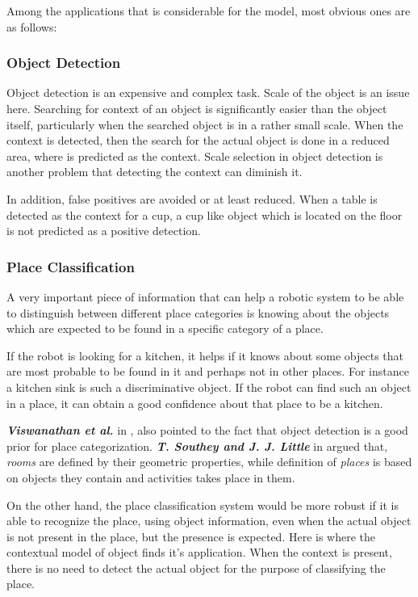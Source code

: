 Among the applications that is considerable for the model, most obvious ones are as follows:


\subsubsection*{Object Detection}

Object detection is an expensive and complex task. Scale of the object is an issue here. Searching for context of 
an object is significantly easier than the object itself, particularly when the searched object is in a rather small scale. 
When the context is detected, then the search for the actual object is done in a reduced area, where is predicted as the context. 
Scale selection in object detection is another problem that detecting the context can diminish it.  

In addition, false positives are avoided or at least reduced. When a table is detected as the context for a cup, a cup like object 
which is located on the floor is not predicted as a positive detection.    

\subsubsection*{Place Classification}
 
      A very important piece of information that can help a robotic system to be able to distinguish between different place categories 
is knowing about the objects which are expected to be found in a specific category of a place. 

If the robot is looking for a kitchen, it helps if it knows about some objects that are most probable to be found in it and 
perhaps not in other places. 
For instance a kitchen sink is such a discriminative object. 
If the robot can find such an object in a place, it can obtain a good confidence about that place to be a kitchen. 

{\bf\it Viswanathan et al.} in \cite{P.Viswanathan}, also  pointed to the fact that object detection is a good prior for place 
categorization. {\bf\it T. Southey and J. J. Little} in \cite{southey2006object} argued that, {\it rooms} are defined by their geometric 
properties, while definition of {\it places} is based on objects they contain and activities takes place in them.  

On the other hand, the place classification system would be more robust if it is able to recognize the place, using object information, 
even when the actual object is not present in the place, but the presence is expected.
Here is where the contextual model of object finds it's application. When the context is present, there is no need to detect the actual 
object for the purpose of classifying the place.

